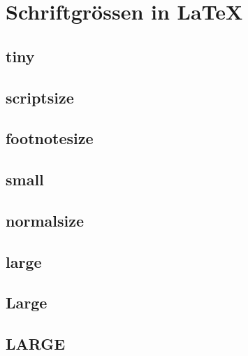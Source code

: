 \documentclass[10pt, a4paper, draft]{article}
\begin{document}
\section{Schriftgrössen in \LaTeX}

\subsection{tiny}

{\tiny \blindtext\par}

\subsection{scriptsize}

{\scriptsize \blindtext\par}

\subsection{footnotesize}

{\footnotesize \blindtext\par}

\subsection{small}

{\small \blindtext\par}

\subsection{normalsize}

{\normalsize \blindtext\par}

\subsection{large}

{\large \blindtext\par}

\subsection{Large}

{\Large \blindtext\par}

\subsection{LARGE}
\end{document}

